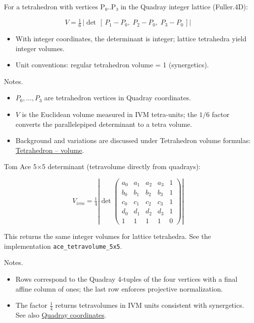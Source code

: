\documentclass[
]{article}
\providecommand{\tightlist}{%
  \setlength{\itemsep}{0pt}\setlength{\parskip}{0pt}}
\begin{document}
For a tetrahedron with vertices P₀..P₃ in the Quadray integer lattice
(Fuller.4D):

\begin{equation}\label{eq:lattice_det}
V = \tfrac{1}{6}\,\left|\det\,[\,P_1 - P_0,\; P_2 - P_0,\; P_3 - P_0\,]\right|
\end{equation}

\begin{itemize}
\tightlist
\item
  With integer coordinates, the determinant is integer; lattice
  tetrahedra yield integer volumes.
\item
  Unit conventions: regular tetrahedron volume = 1 (synergetics).
\end{itemize}

Notes.

\begin{itemize}
\tightlist
\item
  \(P_0,\ldots,P_3\) are tetrahedron vertices in Quadray coordinates.
\item
  \(V\) is the Euclidean volume measured in IVM tetra-units; the \(1/6\)
  factor converts the parallelepiped determinant to a tetra volume.
\item
  Background and variations are discussed under Tetrahedron volume
  formulas:
  \href{https://en.wikipedia.org/wiki/Tetrahedron\#Volume}{Tetrahedron
  -- volume}.
\end{itemize}

Tom Ace 5×5 determinant (tetravolume directly from quadrays):

\begin{equation}\label{eq:ace5x5}
V_{ivm} = \tfrac{1}{4} \left| \det \begin{pmatrix}
 a_0 & a_1 & a_2 & a_3 & 1 \\
 b_0 & b_1 & b_2 & b_3 & 1 \\
 c_0 & c_1 & c_2 & c_3 & 1 \\
 d_0 & d_1 & d_2 & d_3 & 1 \\
 1 & 1 & 1 & 1 & 0
\end{pmatrix} \right|
\end{equation}

This returns the same integer volumes for lattice tetrahedra. See the
implementation \texttt{ace\_tetravolume\_5x5}.

Notes.

\begin{itemize}
\tightlist
\item
  Rows correspond to the Quadray 4-tuples of the four vertices with a
  final affine column of ones; the last row enforces projective
  normalization.
\item
  The factor \(\tfrac{1}{4}\) returns tetravolumes in IVM units
  consistent with synergetics. See also
  \href{https://en.wikipedia.org/wiki/Quadray_coordinates}{Quadray
  coordinates}.
\end{itemize}
\end{document}
